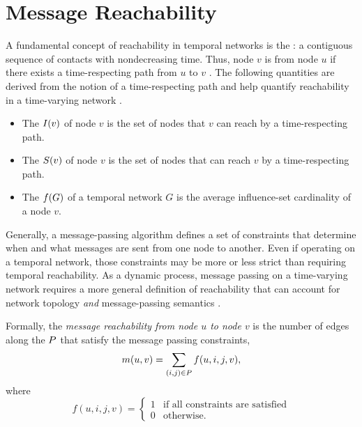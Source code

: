 \section{Message Reachability}\label{sec:reachability}
A fundamental concept of reachability in temporal networks is the : a contiguous sequence of contacts with nondecreasing time. Thus, node $v$ is  from node $u$ if there exists a time-respecting path from $u$ to $v$ \cite{Moody2002}. The following quantities are derived from the notion of a time-respecting path and help quantify reachability in a time-varying network \cite{Holme2012}.
%
\begin{itemize}
    \item The  $I(v)$ of node $v$ is the set of nodes that $v$ can reach by a time-respecting path.
    \item The  $S(v)$ of node $v$ is the set of nodes that can reach $v$ by a time-respecting path.
    \item The  $f(G)$ of a temporal network $G$ is the average influence-set cardinality of a node $v$.
\end{itemize}

Generally, a message-passing algorithm defines a set of constraints that determine when and what messages are sent from one node to another. Even if operating on a temporal network, those constraints may be more or less strict than requiring temporal reachability. As a dynamic process, message passing on a time-varying network requires a more general definition of reachability that can account for network topology \emph{and} message-passing semantics \cite{Barrat2013}.

Formally, the \emph{message reachability from node $u$ to node $v$} is the number of edges along the  $P$ that satisfy the message passing constraints,
%
\begin{equation*}
	m(u, v) = \sum_{(i, j) \in P} f(u, i, j, v),
\end{equation*}
%
where
%
\begin{equation*}
    f(u, i, j, v) = 
        \begin{cases}
            1 & \text{if all constraints are satisfied} \\ 
            0 & \text{otherwise.}
        \end{cases}
\end{equation*}

